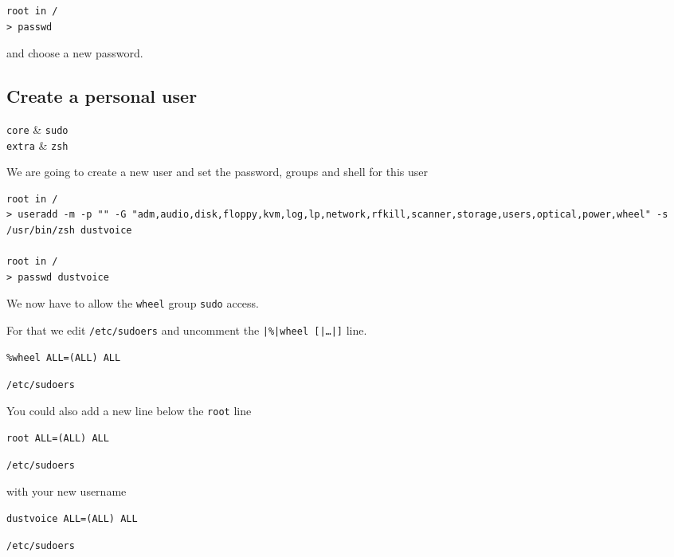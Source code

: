 \documentclass[10pt]{dustdoc}
\begin{document}
\begin{verbatim}
root in /
> passwd
\end{verbatim}

\noindent
and choose a new password.

\subsection{Create a personal user}%
\label{sec:create-a-personal-user}

\begin{pkgtable}
    \texttt{core} & \texttt{sudo} \\
    \texttt{extra} & \texttt{zsh} \\
\end{pkgtable}

We are going to create a new user and set the password, groups and shell for this user

\begin{verbatim}
root in /
> useradd -m -p "" -G "adm,audio,disk,floppy,kvm,log,lp,network,rfkill,scanner,storage,users,optical,power,wheel" -s /usr/bin/zsh dustvoice

root in /
> passwd dustvoice
\end{verbatim}

We now have to allow the \texttt{wheel} group \texttt{sudo} access.

For that we edit \texttt{/etc/sudoers} and uncomment the \texttt{|\%|wheel [|\ldots|]} line.

\begin{mintedlisting}
    \begin{verbatim}
%wheel ALL=(ALL) ALL
    \end{verbatim}

    \caption{\texttt{/etc/sudoers}}
\end{mintedlisting}

You could also add a new line below the \texttt{root} line

\begin{mintedlisting}
    \begin{verbatim}
root ALL=(ALL) ALL
    \end{verbatim}

    \caption{\texttt{/etc/sudoers}}
\end{mintedlisting}

\noindent
with your new username

\begin{mintedlisting}
    \begin{verbatim}
dustvoice ALL=(ALL) ALL
    \end{verbatim}

    \caption{\texttt{/etc/sudoers}}
\end{mintedlisting}
\end{document}
